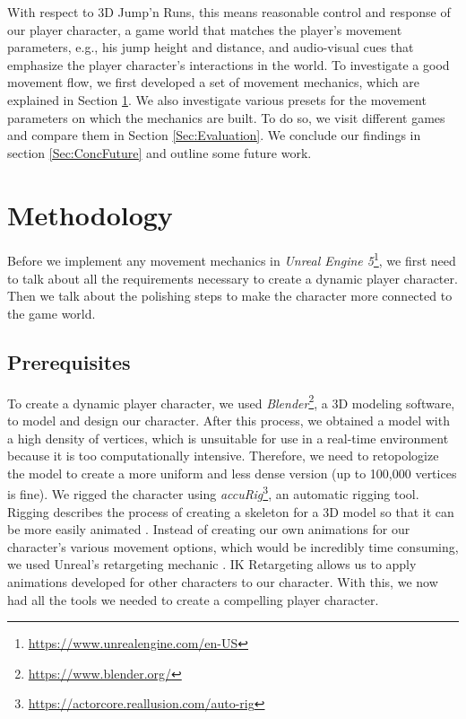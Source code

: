 \documentclass[letterpaper, 10 pt, conference]{ieeeconf}  %
\begin{document}
With respect to 3D Jump'n Runs, this means reasonable control and response of our player character, a game world that matches the player's movement parameters, e.g., his jump height and distance, and audio-visual cues that emphasize the player character's interactions in the world.
To investigate a good movement flow, we first developed a set of movement mechanics, which are explained in Section \ref{Sec:Met}.
We also investigate various presets for the movement parameters on which the mechanics are built.
To do so, we visit different games and compare them in Section \ref{Sec:Evaluation}.
We conclude our findings in section \ref{Sec:ConcFuture} and outline some future work.

\section{Methodology}
\label{Sec:Met}

Before we implement any movement mechanics in \textit{Unreal Engine 5}\footnote{\url{https://www.unrealengine.com/en-US}}, we first need to talk about all the requirements necessary to create a dynamic player character.
Then we talk about the polishing steps to make the character more connected to the game world.

\subsection{Prerequisites}

To create a dynamic player character, we used \textit{Blender}\footnote{\url{https://www.blender.org/}}, a 3D modeling software, to model and design our character.
After this process, we obtained a model with a high density of vertices, which is unsuitable for use in a real-time environment because it is too computationally intensive.
Therefore, we need to retopologize the model to create a more uniform and less dense version (up to 100,000 vertices is fine).
We rigged the character using \textit{accuRig}\footnote{\url{https://actorcore.reallusion.com/auto-rig}}, an automatic rigging tool.
Rigging describes the process of creating a skeleton for a 3D model so that it can be more easily animated \cite{rigging}.
Instead of creating our own animations for our character's various movement options, which would be incredibly time consuming, we used Unreal's retargeting mechanic \cite{retarget}.
IK Retargeting allows us to apply animations developed for other characters to our character.
With this, we now had all the tools we needed to create a compelling player character.
\end{document}
